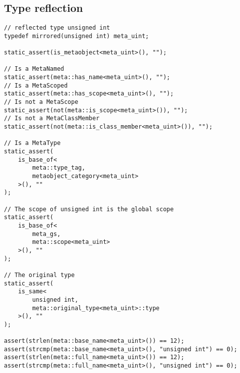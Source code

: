 \subsection{Type reflection}

\begin{verbatim}
// reflected type unsigned int
typedef mirrored(unsigned int) meta_uint;

static_assert(is_metaobject<meta_uint>(), "");

// Is a MetaNamed
static_assert(meta::has_name<meta_uint>(), "");
// Is a MetaScoped
static_assert(meta::has_scope<meta_uint>(), "");
// Is not a MetaScope
static_assert(not(meta::is_scope<meta_uint>()), "");
// Is not a MetaClassMember
static_assert(not(meta::is_class_member<meta_uint>()), "");

// Is a MetaType
static_assert(
	is_base_of<
		meta::type_tag,
		metaobject_category<meta_uint>
	>(), ""
);

// The scope of unsigned int is the global scope
static_assert(
	is_base_of<
		meta_gs,
		meta::scope<meta_uint>
	>(), ""
);

// The original type
static_assert(
	is_same<
		unsigned int,
		meta::original_type<meta_uint>::type
	>(), ""
);

assert(strlen(meta::base_name<meta_uint>()) == 12);
assert(strcmp(meta::base_name<meta_uint>(), "unsigned int") == 0);
assert(strlen(meta::full_name<meta_uint>()) == 12);
assert(strcmp(meta::full_name<meta_uint>(), "unsigned int") == 0);
\end{verbatim}
